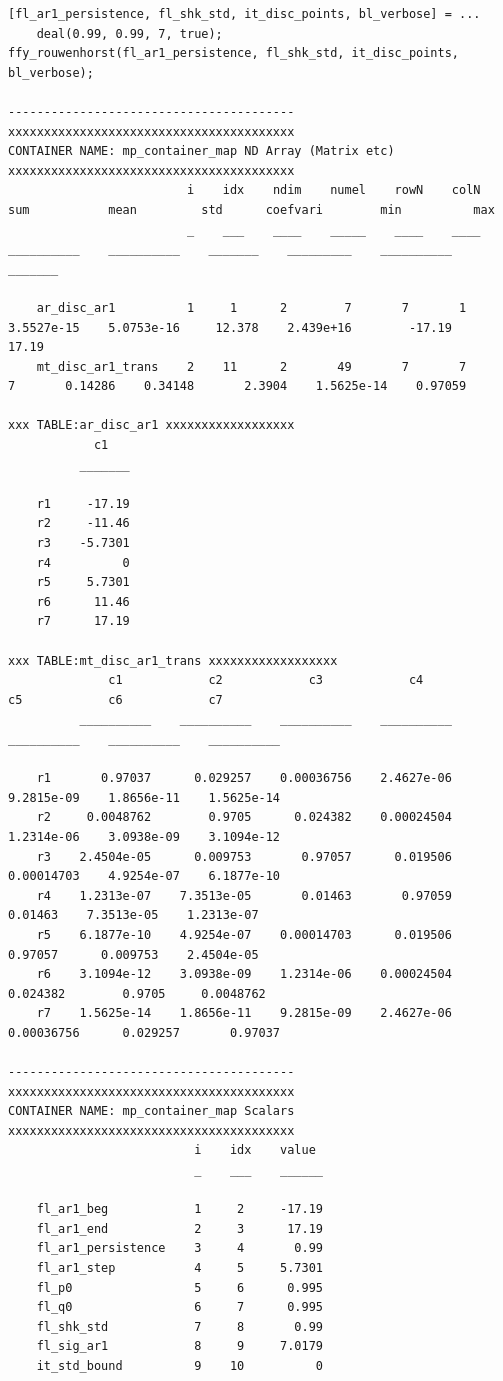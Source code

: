 \documentclass[
]{book}
\begin{document}
\begin{verbatim}
[fl_ar1_persistence, fl_shk_std, it_disc_points, bl_verbose] = ...
    deal(0.99, 0.99, 7, true);
ffy_rouwenhorst(fl_ar1_persistence, fl_shk_std, it_disc_points, bl_verbose);

----------------------------------------
xxxxxxxxxxxxxxxxxxxxxxxxxxxxxxxxxxxxxxxx
CONTAINER NAME: mp_container_map ND Array (Matrix etc)
xxxxxxxxxxxxxxxxxxxxxxxxxxxxxxxxxxxxxxxx
                         i    idx    ndim    numel    rowN    colN       sum           mean         std      coefvari        min          max  
                         _    ___    ____    _____    ____    ____    __________    __________    _______    _________    __________    _______

    ar_disc_ar1          1     1      2        7       7       1      3.5527e-15    5.0753e-16     12.378    2.439e+16        -17.19      17.19
    mt_disc_ar1_trans    2    11      2       49       7       7               7       0.14286    0.34148       2.3904    1.5625e-14    0.97059

xxx TABLE:ar_disc_ar1 xxxxxxxxxxxxxxxxxx
            c1   
          _______

    r1     -17.19
    r2     -11.46
    r3    -5.7301
    r4          0
    r5     5.7301
    r6      11.46
    r7      17.19

xxx TABLE:mt_disc_ar1_trans xxxxxxxxxxxxxxxxxx
              c1            c2            c3            c4            c5            c6            c7    
          __________    __________    __________    __________    __________    __________    __________

    r1       0.97037      0.029257    0.00036756    2.4627e-06    9.2815e-09    1.8656e-11    1.5625e-14
    r2     0.0048762        0.9705      0.024382    0.00024504    1.2314e-06    3.0938e-09    3.1094e-12
    r3    2.4504e-05      0.009753       0.97057      0.019506    0.00014703    4.9254e-07    6.1877e-10
    r4    1.2313e-07    7.3513e-05       0.01463       0.97059       0.01463    7.3513e-05    1.2313e-07
    r5    6.1877e-10    4.9254e-07    0.00014703      0.019506       0.97057      0.009753    2.4504e-05
    r6    3.1094e-12    3.0938e-09    1.2314e-06    0.00024504      0.024382        0.9705     0.0048762
    r7    1.5625e-14    1.8656e-11    9.2815e-09    2.4627e-06    0.00036756      0.029257       0.97037

----------------------------------------
xxxxxxxxxxxxxxxxxxxxxxxxxxxxxxxxxxxxxxxx
CONTAINER NAME: mp_container_map Scalars
xxxxxxxxxxxxxxxxxxxxxxxxxxxxxxxxxxxxxxxx
                          i    idx    value 
                          _    ___    ______

    fl_ar1_beg            1     2     -17.19
    fl_ar1_end            2     3      17.19
    fl_ar1_persistence    3     4       0.99
    fl_ar1_step           4     5     5.7301
    fl_p0                 5     6      0.995
    fl_q0                 6     7      0.995
    fl_shk_std            7     8       0.99
    fl_sig_ar1            8     9     7.0179
    it_std_bound          9    10          0
\end{verbatim}
\end{document}
